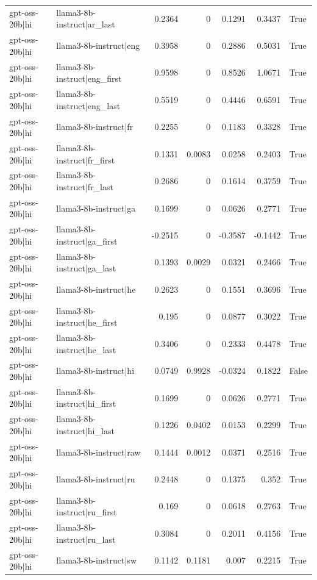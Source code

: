 \begin{table}
\begin{tabular}{l l r r r r l}
gpt-oss-20b|hi & llama3-8b-instruct|ar_last & 0.2364 & 0 & 0.1291 & 0.3437 & True \\
gpt-oss-20b|hi & llama3-8b-instruct|eng & 0.3958 & 0 & 0.2886 & 0.5031 & True \\
gpt-oss-20b|hi & llama3-8b-instruct|eng_first & 0.9598 & 0 & 0.8526 & 1.0671 & True \\
gpt-oss-20b|hi & llama3-8b-instruct|eng_last & 0.5519 & 0 & 0.4446 & 0.6591 & True \\
gpt-oss-20b|hi & llama3-8b-instruct|fr & 0.2255 & 0 & 0.1183 & 0.3328 & True \\
gpt-oss-20b|hi & llama3-8b-instruct|fr_first & 0.1331 & 0.0083 & 0.0258 & 0.2403 & True \\
gpt-oss-20b|hi & llama3-8b-instruct|fr_last & 0.2686 & 0 & 0.1614 & 0.3759 & True \\
gpt-oss-20b|hi & llama3-8b-instruct|ga & 0.1699 & 0 & 0.0626 & 0.2771 & True \\
gpt-oss-20b|hi & llama3-8b-instruct|ga_first & -0.2515 & 0 & -0.3587 & -0.1442 & True \\
gpt-oss-20b|hi & llama3-8b-instruct|ga_last & 0.1393 & 0.0029 & 0.0321 & 0.2466 & True \\
gpt-oss-20b|hi & llama3-8b-instruct|he & 0.2623 & 0 & 0.1551 & 0.3696 & True \\
gpt-oss-20b|hi & llama3-8b-instruct|he_first & 0.195 & 0 & 0.0877 & 0.3022 & True \\
gpt-oss-20b|hi & llama3-8b-instruct|he_last & 0.3406 & 0 & 0.2333 & 0.4478 & True \\
gpt-oss-20b|hi & llama3-8b-instruct|hi & 0.0749 & 0.9928 & -0.0324 & 0.1822 & False \\
gpt-oss-20b|hi & llama3-8b-instruct|hi_first & 0.1699 & 0 & 0.0626 & 0.2771 & True \\
gpt-oss-20b|hi & llama3-8b-instruct|hi_last & 0.1226 & 0.0402 & 0.0153 & 0.2299 & True \\
gpt-oss-20b|hi & llama3-8b-instruct|raw & 0.1444 & 0.0012 & 0.0371 & 0.2516 & True \\
gpt-oss-20b|hi & llama3-8b-instruct|ru & 0.2448 & 0 & 0.1375 & 0.352 & True \\
gpt-oss-20b|hi & llama3-8b-instruct|ru_first & 0.169 & 0 & 0.0618 & 0.2763 & True \\
gpt-oss-20b|hi & llama3-8b-instruct|ru_last & 0.3084 & 0 & 0.2011 & 0.4156 & True \\
gpt-oss-20b|hi & llama3-8b-instruct|sw & 0.1142 & 0.1181 & 0.007 & 0.2215 & True \\

\end{tabular}
\end{table}
